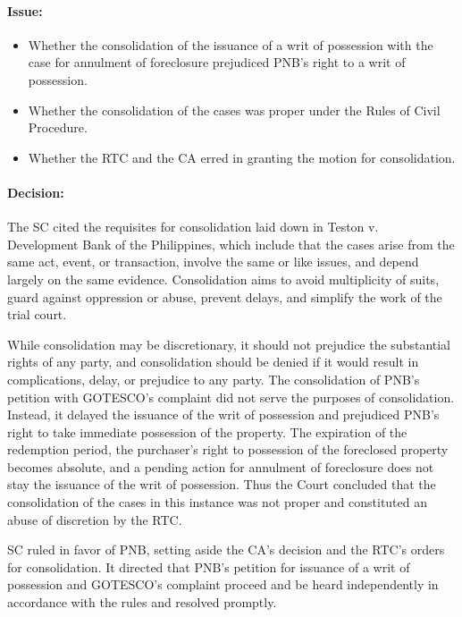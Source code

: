 \documentclass[
12pt,
oneside,
onehalfspacing,
headsepline
]{DigestCollection}
\begin{document}
\paragraph{Issue:}
\label{4d1595c0-1154-11ef-b8ef-a5537d38c9c8}

\begin{itemize}
  \item Whether the consolidation of the issuance of a writ of possession with the case for annulment of foreclosure prejudiced PNB's right to a writ of possession.
  \item Whether the consolidation of the cases was proper under the Rules of Civil Procedure.
  \item Whether the RTC and the CA erred in granting the motion for consolidation.
\end{itemize}


\paragraph{Decision:}
\label{4aa61c60-1154-11ef-b8ef-a5537d38c9c8}


The SC cited the requisites for consolidation laid down in Teston v. \\Development Bank of the Philippines, which include that the cases arise from the same act, event, or transaction, involve the same or like issues, and depend largely on the same evidence. Consolidation aims to avoid multiplicity of suits, guard against oppression or abuse, prevent delays, and simplify the work of the trial court.

While consolidation may be discretionary, it should not prejudice the substantial rights of any party, and consolidation should be denied if it would result in complications, delay, or prejudice to any party. The consolidation of PNB's petition with GOTESCO's complaint did not serve the purposes of consolidation. Instead, it delayed the issuance of the writ of possession and prejudiced PNB's right to take immediate possession of the property. The expiration of the redemption period, the purchaser's right to possession of the foreclosed property becomes absolute, and a pending action for annulment of foreclosure does not stay the issuance of the writ of possession. Thus the Court concluded that the consolidation of the cases in this instance was not proper and constituted an abuse of discretion by the RTC. 

SC ruled in favor of PNB, setting aside the CA's decision and the RTC's orders for consolidation. It directed that PNB's petition for issuance of a writ of possession and GOTESCO's complaint proceed and be heard independently in accordance with the rules and resolved promptly.
\end{document}
